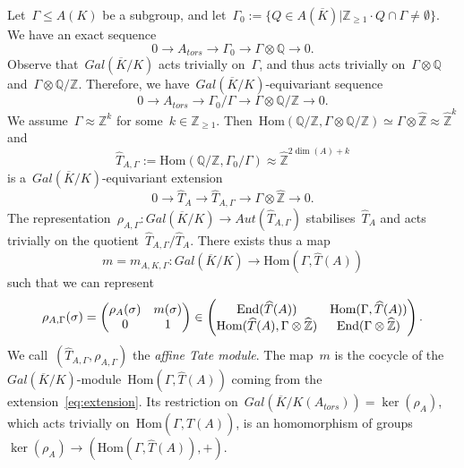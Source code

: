 \documentclass[12pt]{amsart}
\newcommand{\Hom}{\mbox{Hom}}
\newcommand{\End}{{\rm End}}
\newcommand{\Z}{{\mathbb Z}}
\newcommand{\Q}{{\mathbb Q}}
\newcommand{\ol}{\overline}
\newcommand{\wh}{\widehat}
\newcommand{\tens}{\otimes}
\begin{document}
Let~$\Gamma\leq A(K)$ be a subgroup, and let~$\Gamma_0:=\{Q\in A(\ol{K})|\Z_{\geq1}\cdot Q\cap \Gamma\neq \emptyset\}$. We have an exact sequence
\[
0\to A_{tors}\to \Gamma_0\to \Gamma\tens \Q\to 0.
\]
Observe that~$Gal(\ol{K}/K)$ acts trivially on~$\Gamma$, and thus acts trivially on~$\Gamma\tens \Q$ and~$\Gamma\tens\Q/\Z$.
Therefore, we have~$Gal(\ol{K}/K)$-equivariant sequence
\[
0\to A_{tors}\to \Gamma_0/\Gamma \to \Gamma\tens \Q/\Z\to 0.
\]
We assume~$\Gamma\approx\Z^k$ for some~$k\in\Z_{\geq1}$. Then~$\Hom(\Q/\Z,\Gamma\tens\Q/\Z)\simeq \Gamma\tens\wh{\Z}\approx\wh{\Z}^k$ and
\[
\wh{T}_{A,\Gamma}:=
\Hom(\Q/\Z, \Gamma_0/\Gamma)
\approx 
\wh{\Z}^{2\dim(A)+k}
\]
is a~$Gal(\ol{K}/K)$-equivariant extension
\begin{equation}\label{eq:extension}
0\to \wh{T}_{A}\to \wh{T}_{A,\Gamma}\to \Gamma\tens\wh{\Z}\to 0.
\end{equation}
The representation~$\rho_{A,\Gamma}:Gal(\ol{K}/K)\to Aut(\wh{T}_{A,\Gamma})$ stabilises~$\wh{T}_{A}$ and acts trivially on the quotient~$\wh{T}_{A,\Gamma}/\wh{T}_{A}$. There exists thus a map
\[
m=m_{A,K,\Gamma}:Gal(\ol{K}/K)\to\Hom(\Gamma,\wh{T}(A))
\] such that we can represent
\[
\rho_{A,\Gamma}(\sigma)
=
\begin{pmatrix}
\rho_A(\sigma)&m(\sigma)\\
0& 1
\end{pmatrix}
\in
\begin{pmatrix}
\End(\wh{T}(A))&\Hom(\Gamma,\wh{T}(A))\\
\Hom(\wh{T}(A),\Gamma\tens\wh{\Z})& \End(\Gamma\tens\wh{\Z})
\end{pmatrix}.
\]
We call~$(\wh{T}_{A,\Gamma},\rho_{A,\Gamma})$ the \emph{affine Tate module}. The map~$m$ is the cocycle of the~$Gal(\ol{K}/K)$-module~$\Hom(\Gamma,\wh{T}(A))$ coming
from the extension~\eqref{eq:extension}. Its restriction on~$Gal(\ol{K}/K(A_{tors}))=\ker(\rho_A)$, which acts trivially on~$\Hom(\Gamma,\wh{T}(A))$, is an homomorphism of groups~$\ker(\rho_A)\to (\Hom(\Gamma,\wh{T}(A)),+)$. 
\end{document}

